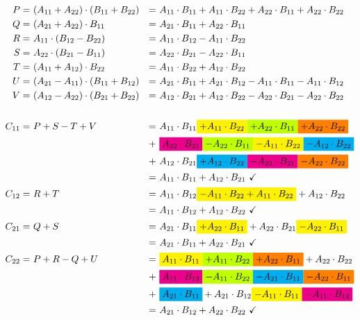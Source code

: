\begin{align*}
	P  =&\ (A_{1 1} + A_{2 2}) \cdot (B_{1 1} + B_{2 2})
	  &=&\ A_{1 1} \cdot B_{1 1} + A_{1 1} \cdot B_{2 2} + A_{2 2} \cdot B_{1 1} + A_{2 2} \cdot B_{2 2} \\
	Q  =&\ (A_{2 1} + A_{2 2}) \cdot B_{1 1}
	  &=&\ A_{2 1} \cdot B_{1 1} + A_{2 2} \cdot B_{1 1} \\
	R  =&\ A_{1 1} \cdot (B_{1 2} - B_{2 2})
	  &=&\ A_{1 1} \cdot B_{1 2} - A_{1 1} \cdot B_{2 2} \\
	S  =&\ A_{2 2} \cdot (B_{2 1} - B_{1 1})
	  &=&\ A_{2 2} \cdot B_{2 1} - A_{2 2} \cdot B_{1 1} \\
	T  =&\ (A_{1 1} + A_{1 2}) \cdot B_{2 2}
	  &=&\ A_{1 1} \cdot B_{2 2} + A_{1 2} \cdot B_{2 2} \\
	U  =&\ (A_{2 1} - A_{1 1}) \cdot (B_{1 1} + B_{1 2})
	  &=&\ A_{2 1} \cdot B_{1 1} + A_{2 1} \cdot B_{1 2} - A_{1 1} \cdot B_{1 1} - A_{1 1} \cdot B_{1 2} \\
	V  =&\ (A_{1 2} - A_{2 2}) \cdot (B_{2 1} + B_{2 2})
	  &=&\ A_{1 2} \cdot B_{2 1} + A_{1 2} \cdot B_{2 2} - A_{2 2} \cdot B_{2 1} - A_{2 2} \cdot B_{2 2} \\ \\
	C_{1 1} =&\ P + S - T + V
	       &=&\ A_{1 1} \cdot B_{1 1} \hlc{+ A_{1 1} \cdot B_{2 2}} \hlc[lime]{+ A_{2 2} \cdot B_{1 1}} \hlc[orange]{+ A_{2 2} \cdot B_{2 2}} \\
		  &&+&\ \hlc[magenta]{A_{2 2} \cdot B_{2 1}} \hlc[lime]{- A_{2 2} \cdot B_{1 1}} \hlc{- A_{1 1} \cdot B_{2 2}} \hlc[cyan]{- A_{1 2} \cdot B_{2 2}} \\
	      &&+&\ A_{1 2} \cdot B_{2 1} \hlc[cyan]{+ A_{1 2} \cdot B_{2 2}} \hlc[magenta]{- A_{2 2} \cdot B_{2 1}} \hlc[orange]{- A_{2 2} \cdot B_{2 2}} \\
		  &&=&\ A_{1 1} \cdot B_{1 1} + A_{1 2} \cdot B_{2 1}\ \checkmark \\
	C_{1 2} =&\ R + T
	       &=&\ A_{1 1} \cdot B_{1 2} \hlc{- A_{1 1} \cdot B_{2 2} + A_{1 1} \cdot B_{2 2}} + A_{1 2} \cdot B_{2 2} \\
	      &&=&\ A_{1 1} \cdot B_{1 2} + A_{1 2} \cdot B_{2 2}\ \checkmark \\
	C_{2 1} =&\ Q + S
		   &=&\ A_{2 1} \cdot B_{1 1} \hlc{+ A_{2 2} \cdot B_{1 1}} + A_{2 2} \cdot B_{2 1} \hlc{- A_{2 2} \cdot B_{1 1}} \\
	      &&=&\ A_{2 1} \cdot B_{1 1} + A_{2 2} \cdot B_{2 1}\ \checkmark \\
	C_{2 2} =&\ P + R - Q + U
		   &=&\ \hlc{A_{1 1} \cdot B_{1 1}} \hlc[lime]{+ A_{1 1} \cdot B_{2 2}} \hlc[orange]{+ A_{2 2} \cdot B_{1 1}} + A_{2 2} \cdot B_{2 2} \\
		  &&+&\ \hlc[magenta]{A_{1 1} \cdot B_{1 2}} \hlc[lime]{- A_{1 1} \cdot B_{2 2}} \hlc[cyan]{- A_{2 1} \cdot B_{1 1}} \hlc[orange]{- A_{2 2} \cdot B_{1 1}} \\
		  &&+&\ \hlc[cyan]{A_{2 1} \cdot B_{1 1}} + A_{2 1} \cdot B_{1 2} \hlc{- A_{1 1} \cdot B_{1 1}} \hlc[magenta]{- A_{1 1} \cdot B_{1 2}} \\
	      &&=&\ A_{2 1} \cdot B_{1 2} + A_{2 2} \cdot B_{2 2}\ \checkmark
\end{align*}
